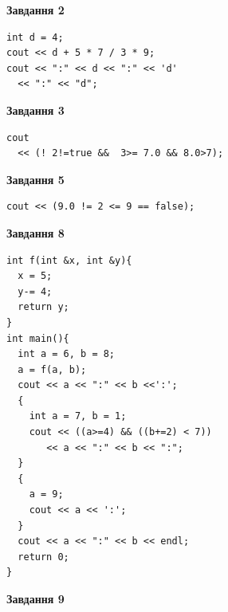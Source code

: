 \documentclass[12pt, ukrainian]{article}
\begin{document}
{\begin {large}
\begin{minipage}[t]{7.0cm}
\end{minipage}
\vline \hspace{1mm}
\begin{minipage}[t]{11.0cm}

\begin{center}
\textbf{Завдання 2}
\end{center}
\vspace{-8mm}

\begin{verbatim}
int d = 4;
cout << d + 5 * 7 / 3 * 9;
cout << ":" << d << ":" << 'd' 
  << ":" << "d";
\end{verbatim}



\begin{center}
\textbf{Завдання 3}
\end{center}
\vspace{-8mm}

\begin{verbatim}
cout 
  << (! 2!=true &&  3>= 7.0 && 8.0>7);
\end{verbatim}



\begin{center}
\textbf{Завдання 5}
\end{center}
\vspace{-8mm}

\begin{verbatim}
cout << (9.0 != 2 <= 9 == false);
\end{verbatim}



\begin{center}
\textbf{Завдання 8}
\end{center}
\vspace{-8mm}

\begin{verbatim}
int f(int &x, int &y){
  x = 5;
  y-= 4;
  return y;
}
int main(){
  int a = 6, b = 8;
  a = f(a, b);
  cout << a << ":" << b <<':';
  {
    int a = 7, b = 1;
    cout << ((a>=4) && ((b+=2) < 7))
       << a << ":" << b << ":";
  }
  {
    a = 9;
    cout << a << ':';
  }
  cout << a << ":" << b << endl;
  return 0;
}
\end{verbatim}

\end{minipage}


\begin{minipage}[t]{7.0cm}

\begin{center}
\textbf{Завдання 9}
\end{center}
\vspace{-8mm}


\end{minipage}
\end{large}}
\end{document}
